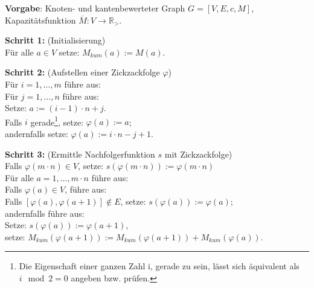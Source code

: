 \newpage

\begin{algo}
\label{Algo_Zickzack}
\textbf{Vorgabe}: Knoten- und kantenbewerteter Graph $G=[V,E,c,M]$, Kapazitätsfunktion $\overline{M}:V \rightarrow \mathbb{R}_>$.

\noindent 
\textbf{Schritt 1:} (Initialisierung)\\
\phantom \quad Für alle $a \in V$ setze: $M_{kum}(a) := M(a)$.

\noindent 
\textbf{Schritt 2:} (Aufstellen einer Zickzackfolge $\varphi$)\\
\phantom \quad Für $i=1,\dots,m$ führe aus:\\
\phantom \quad \qquad Für $j=1,\dots,n$ führe aus:\\
\phantom \quad \qquad \qquad Setze: $a := (i-1) \cdot n + j$.\\
\phantom \quad \qquad \qquad Falls $i$ gerade\footnote{Die Eigenschaft einer ganzen Zahl i, gerade zu sein, lässt sich äquivalent als $i\mod 2 = 0$ angeben bzw. prüfen.}, setze: $\varphi(a) := a$;\\
\phantom \quad \qquad \qquad andernfalls setze: $\varphi(a) := i \cdot n -j +1$.

\noindent 
\textbf{Schritt 3:} (Ermittle Nachfolgerfunktion $s$ mit Zickzackfolge)\\
\phantom \quad Falls $\varphi(m \cdot n) \in V$, setze: $s(\varphi(m \cdot n)) := \varphi(m \cdot n)$\\
\phantom \quad Für alle $a=1,\dots,m \cdot n$ führe aus:\\
\phantom \quad \qquad Falls $\varphi(a) \in V$, führe aus:\\
\phantom \quad \qquad \qquad Falls $[\varphi(a),\varphi(a+1)] \notin E$, setze: $s(\varphi(a)):=\varphi(a)$;\\
\phantom \quad \qquad \qquad andernfalls führe aus:\\
\phantom \quad \qquad \qquad \qquad Setze: $s(\varphi(a)):=\varphi(a+1)$,\\ 
\phantom \quad \qquad \qquad \qquad setze: $M_{kum}(\varphi(a+1)) := M_{kum}(\varphi(a+1)) + M_{kum}(\varphi(a))$.
\end{algo}

